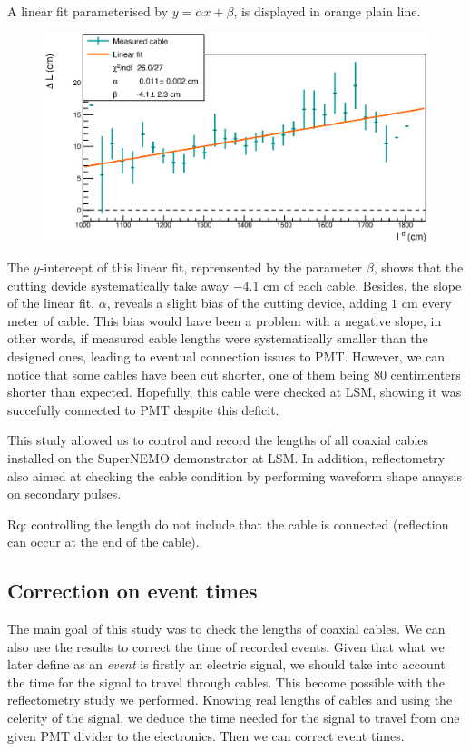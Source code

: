 A linear fit parameterised by $y = \alpha x + \beta$, is displayed in orange plain line.
\begin{figure}
  \centering
  \includegraphics[width=15cm]{commissioning/fig_commissioning/cut_biais.eps}
  \label{fig:CutBias}
  \caption{}
\end{figure}
The $y$-intercept of this linear fit, reprensented by the parameter $\beta$, shows that the cutting devide systematically take away $-4.1$ cm of each cable.
Besides, the slope of the linear fit, $\alpha$, reveals a slight bias of the cutting device, adding $1$ cm every meter of cable.
This bias would have been a problem with a negative slope, in other words, if measured cable lengths were systematically smaller than the designed ones, leading to eventual connection issues to PMT.
However, we can notice that some cables have been cut shorter, one of them being $80$ centimenters shorter than expected.
Hopefully, this cable were checked at LSM, showing it was succefully connected to PMT despite this deficit.

This study allowed us to control and record the lengths of all coaxial cables installed on the SuperNEMO demonstrator at LSM.
In addition, reflectometry also aimed at checking the cable condition by performing waveform shape anaysis on secondary pulses.

Rq: controlling the length do not include that the cable is connected (reflection can occur at the end of the cable).


\subsection{Correction on event times}
\label{subsec:time_correction}

The main goal of this study was to check the lengths of coaxial cables.
We can also use the results to correct the time of recorded events.
Given that what we later define as an \emph{event} is firstly an electric signal, we should take into account the time for the signal to travel through cables.
This become possible with the reflectometry study we performed.
Knowing real lengths of cables and using the celerity of the signal, we deduce the time needed for the signal to travel from one given PMT divider to the electronics.
Then we can correct event times.



